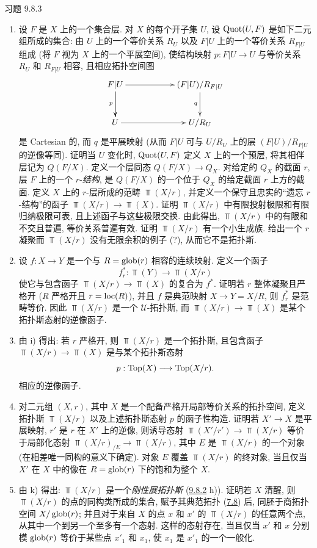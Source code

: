 \begin{enonce*}[remark]{习题 9.8.3}
\begin{enumerate}
\item 设 $F$ 是 $X$ 上的一个集合层.
对 $X$ 的每个开子集 $U$,
设 $\operatorname{Quot}(U,F)$ 是如下二元组所成的集合:
由 $U$ 上的一个等价关系 $R_U$
以及 $F|U$ 上的一个等价关系 $R_{F|U}$ 组成
(将 $F$ 视为 $X$ 上的一个平展空间),
使结构映射 $p:F|U\rightarrow U$
与等价关系 $R_U$ 和 $R_{F|U}$ 相容,
且相应拓扑空间图
\[
\xymatrix@C=2cm@R=1cm{
F|U \ar[r]\ar[d] \ar[d]_{p}& (F|U)/R_{F|U} \ar[d]_{q}\\
U   \ar[r]&  U/R_{U} }
\]
是 Cartesian 的, 而 $q$ 是平展映射
(从而 $F|U$ 可与 $U/R_U$ 上的层 $(F|U)/R_{F|U}$ 的逆像等同).
证明当 $U$ 变化时, $\operatorname{Quot}(U,F)$ 定义 $X$ 上的一个预层,
将其相伴层记为 $Q(F/X)$.
定义一个层同态 $Q(F/X)\rightarrow Q_X$.
对给定的 $Q_X$ 的截面 $r$,
层 $F$ 上的一个 $r$-\emph{结构},
是 $Q(F/X)$ 的一个位于 $Q_X$ 的给定截面 $r$ 上方的截面.
定义 $X$ 上的 $r$-层所成的范畴 $\Top(X/r)$,
并定义一个保守且忠实的“遗忘 $r$-结构”的函子
$\Top(X/r)\rightarrow\Top(X)$.
证明 $\Top(X/r)$ 中有限投射极限和有限归纳极限可表,
且上述函子与这些极限交换.
由此得出, $\Top(X/r)$ 中的有限和不交且普遍,
等价关系普遍有效.
证明 $\Top(X/r)$ 有一个小生成族.
给出一个 $r$ 凝聚而 $\Top(X/r)$ 没有无限余积的例子 (?),
从而它不是拓扑斯.

\item 设 $f:X\rightarrow Y$ 是一个与 $R=\operatorname{glob}(r)$ 相容的连续映射.
定义一个函子
$$
f^{\ast}_r:\Top(Y)\longrightarrow\Top(X/r)
$$
使它\pageoriginale 与包含函子 $\Top(X/r)\rightarrow\Top(X)$ 的复合为 $f^{\ast}$.
证明若 $r$ 整体凝聚且严格开
(\ie $R$ 严格开且 $r=\operatorname{loc}(R)$),
并且 $f$ 是典范映射 $X\rightarrow Y=X/R$,
则 $f^{\ast}_r$ 是范畴等价.
因此 $\Top(X/r)$ 是一个 $𝒰$-拓扑斯,
而 $\Top(X/r)\rightarrow\Top(X)$ 是某个拓扑斯态射的逆像函子.

\item 由 i) 得出: 若 $r$ 严格开,
则 $\Top(X/r)$ 是一个拓扑斯,
且包含函子 $\Top(X/r)\rightarrow\Top(X)$
是与某个拓扑斯态射
$$
p:\operatorname{Top}(X)\longrightarrow\operatorname{Top}(X/r){}.
$$
相应的逆像函子.

\item 对二元组 $(X,r)$,
其中 $X$ 是一个配备严格开局部等价关系的拓扑空间,
定义拓扑斯 $\Top(X/r)$ 以及上述拓扑斯态射 $p$ 的函子性构造.
证明若 $X'\rightarrow X$ 是平展映射,
$r'$ 是 $r$ 在 $X'$ 上的逆像,
则诱导态射 $\Top(X'/r')\rightarrow\Top(X/r)$
等价于局部化态射 $\Top(X/r)_{/E}\rightarrow\Top(X/r)$,
其中 $E$ 是 $\Top(X/r)$ 的一个对象 (在相差唯一同构的意义下确定).
对象 $E$ 覆盖 $\Top(X/r)$ 的终对象,
当且仅当 $X'$ 在 $X$ 中的像在 $R=\operatorname{glob}(r)$ 下的饱和为整个 $X$.

\item 由 k) 得出: $\Top(X/r)$ 是一个\emph{刚性展拓扑斯}
(\hyperref[IV.exer9.8.2]{9.8.2} h)).
证明若 $X$ 清醒,
则 $\Top(X/r)$ 的点的同构类所成的集合,
赋予其典范拓扑 (\hyperref[IV.exer7.8]{7.8}) 后,
同胚于商拓扑空间 $X/\operatorname{glob}(r)$;
并且对于来自 $X$ 的点 $x$ 和 $x'$ 的 $\Top(X/r)$ 的任意两个点,
从其中一个到另一个至多有一个态射.
这样的态射存在, 当且仅当 $x'$ 和 $x$
分别模 $\operatorname{glob}(r)$ 等价于某些点 $x'_1$ 和 $x_1$,
使 $x_1$ 是 $x'_1$ 的一个一般化.


\end{enumerate}
\end{enonce*}
